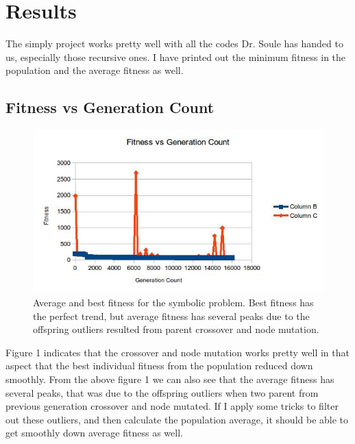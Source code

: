\documentclass[10pt,b5paper]{article}
\begin{document}
\section{Results}
\label{sec-2}
The simply project works pretty well with all the codes Dr. Soule has handed to us, especially those recursive ones. I have printed out the minimum fitness in the population and the average fitness as well. 
\subsection{Fitness vs Generation Count}
\label{sec-2-1}
\begin{figure}[htb]
\centering
\includegraphics[width=.9\linewidth]{./fitness.jpg}
\caption{Average and best fitness for the symbolic problem. Best fitness has the perfect trend, but average fitness has several peaks due to the offspring outliers resulted from parent crossover and node mutation.}
\end{figure}
Figure 1 indicates that the crossover and node mutation works pretty well in that aspect that the best individual fitness from the population reduced down smoothly. 
From the above figure 1 we can also see that the average fitness has several peaks, that was due to the offspring outliers when two parent from previous generation crossover and node mutated. If I apply some tricks to filter out these outliers, and then calculate the population average, it should be able to get smoothly down average fitness as well.
\end{document}
